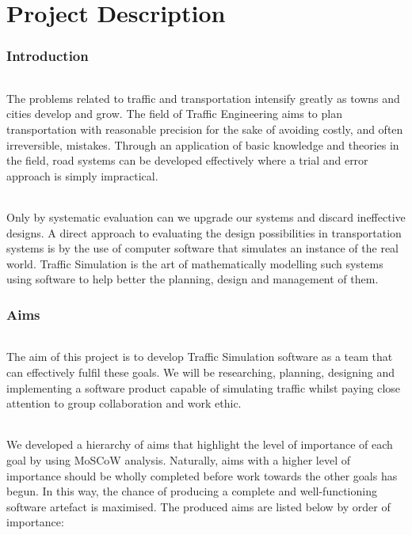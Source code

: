 \documentclass[11pt,a4paper]{article}
\begin{document}
\part{Project Description}

\section{Introduction}
\paragraph{}
The problems related to traffic and transportation intensify greatly as towns and cities develop and grow. The field of Traffic Engineering aims to plan transportation with reasonable precision for the sake of avoiding costly, and often irreversible, mistakes. Through an application of basic knowledge and theories in the field, road systems can be developed effectively where a trial and error approach is simply impractical.

\paragraph{}
Only by systematic evaluation can we upgrade our systems and discard ineffective designs. A direct approach to evaluating the design possibilities in transportation systems is by the use of computer software that simulates an instance of the real world. Traffic Simulation is the art of mathematically modelling such systems using software to help better the planning, design and management of them.

\section{Aims}
\paragraph{}
The aim of this project is to develop Traffic Simulation software as a team that can effectively fulfil these goals. We will be researching, planning, designing and implementing a software product capable of simulating traffic whilst paying close attention to group collaboration and work ethic.

\paragraph{}
We developed a hierarchy of aims that highlight the level of importance of each goal by using MoSCoW analysis. Naturally, aims with a higher level of importance should be wholly completed before work towards the other goals has begun. In this way, the chance of producing a complete and well-functioning software artefact is maximised. The produced aims are listed below by order of importance:
\end{document}
